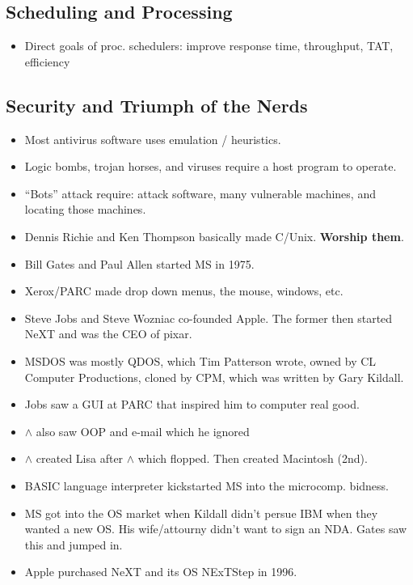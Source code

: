 \documentclass[fontsize=4.5pt]{scrartcl}
\begin{document}
\begin{multicols}{3}
    \subsection{Scheduling and Processing}
      \begin{itemize}
        \item Direct goals of proc. schedulers: improve response time, throughput, TAT, efficiency
      \end{itemize}

    
    
    \subsection{Security and Triumph of the Nerds}
      \begin{itemize}
        \item Most antivirus software uses emulation / heuristics.
        \item Logic bombs, trojan horses, and viruses require a host program to operate.
        \item ``Bots'' attack require: attack software, many vulnerable machines, and locating those machines.
        \item Dennis Richie and Ken Thompson basically made C/Unix. \textbf{Worship them}.
        \item Bill Gates and Paul Allen started MS in 1975.
        \item Xerox/PARC made drop down menus, the mouse, windows, etc.
        \item Steve Jobs and Steve Wozniac co-founded Apple. The former then started NeXT and was the CEO of pixar.
        \item MSDOS was mostly QDOS, which Tim Patterson wrote, owned by CL Computer Productions, cloned by CPM, which was written by Gary Kildall.
        \item Jobs saw a GUI at PARC that inspired him to computer real good.
        \item $\wedge$ also saw OOP and e-mail which he ignored
        \item $\wedge$ created Lisa after $\wedge$ which flopped. Then created Macintosh (2nd).
        \item BASIC language interpreter kickstarted MS into the microcomp. bidness.
        \item MS got into the OS market when Kildall didn't persue IBM when they wanted a new OS. His wife/attourny didn't want to sign an NDA. Gates saw this and jumped in.
        \item Apple purchased NeXT and its OS NExTStep in 1996.

\end{itemize}
\end{multicols}
\end{document}
